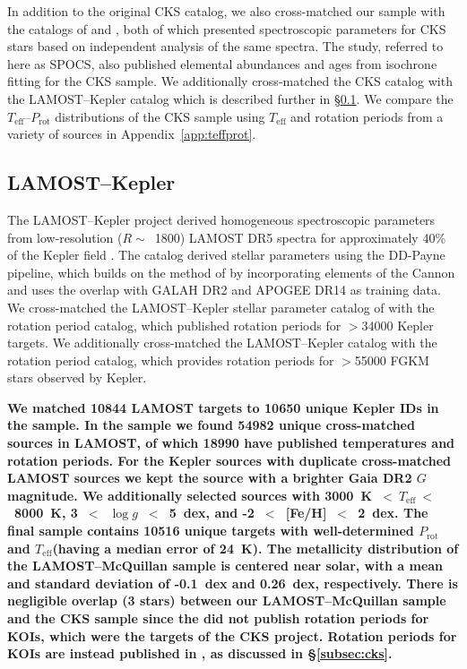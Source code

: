 \documentclass[linenumbers,tighten,trackchanges,twocolumn]{aastex631}
\newcommand{\teff}{\ensuremath{T_{\mathrm{eff}}}\xspace}
\newcommand{\logg}{\ensuremath{\log g}\xspace}
\newcommand{\prot}{\ensuremath{P_\mathrm{rot}}\xspace}
\begin{document}
In addition to the original CKS catalog, we also cross-matched our sample with the catalogs of \citet{Brewer2018} and \citet{Martinez2019}, both of which presented spectroscopic parameters for CKS stars based on independent analysis of the same spectra. The \citet{Brewer2018} study, referred to here as SPOCS, also published elemental abundances and ages from isochrone fitting for the CKS sample. We additionally cross-matched the CKS catalog with the LAMOST--Kepler catalog \citep{Xiang2019} which is described further in \S\ref{subsec:lamost}. We compare the \teff--\prot distributions of the CKS sample using \teff and rotation periods from a variety of sources in Appendix~\ref{app:teffprot}.

\subsection{LAMOST--Kepler} \label{subsec:lamost}
The LAMOST--Kepler project derived homogeneous spectroscopic parameters from low-resolution ($R\sim$~1800) LAMOST DR5 spectra for approximately 40\% of the Kepler field \citep{Zong2018, Xiang2019}. The \citet{Xiang2019} catalog derived stellar parameters using the DD-Payne pipeline, which builds on the method of \citet{Ting2017b} by incorporating elements of the Cannon \citep{Ness2015} and uses the overlap with GALAH DR2 and APOGEE DR14 as training data. We cross-matched the LAMOST--Kepler stellar parameter catalog of \citet{Xiang2019} with the \citet{McQuillan2014} rotation period catalog, which published rotation periods for $>$34000 Kepler targets. {\color{red} We additionally cross-matched the LAMOST--Kepler catalog with the \citet{Santos2021} rotation period catalog, which provides rotation periods for $>$55000 FGKM stars observed by Kepler.}

\textbf{We matched 10844 LAMOST targets to 10650 unique Kepler IDs in the \citet{McQuillan2014} sample. In the \citet{Santos2021} sample we found 54982 unique cross-matched sources in LAMOST, of which 18990 have published temperatures and rotation periods. For the Kepler sources with duplicate cross-matched LAMOST sources we kept the source with a brighter Gaia DR2 $G$ magnitude. We additionally selected sources with 3000~K~$<~\teff~<$~8000~K, 3~$<$~\logg~$<$~5~dex, and -2~$<$~[Fe/H]~$<$~2~dex. The final sample contains 10516 unique targets with well-determined \prot and \teff (having a median error of 24~K). The metallicity distribution of the LAMOST--McQuillan sample is centered near solar, with a mean and standard deviation of -0.1~dex and 0.26~dex, respectively. There is negligible overlap (3 stars) between our LAMOST--McQuillan sample and the CKS sample since the \citet{McQuillan2014} did not publish rotation periods for KOIs, which were the targets of the CKS project. Rotation periods for KOIs are instead published in \citet{McQuillan2013}, as discussed in \S\ref{subsec:cks}.}
\end{document}
